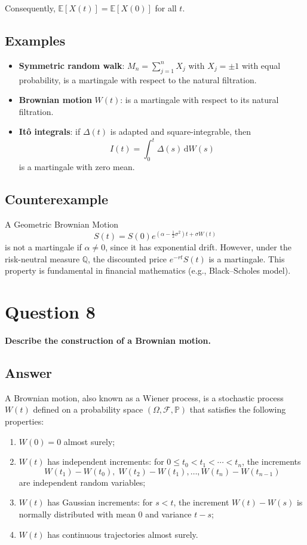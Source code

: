\documentclass[12pt,a4paper]{book}
\theoremstyle{remark}
\newcommand{\PP}{\mathbb{P}}          %
\newcommand{\EE}{\mathbb{E}}          %
\newcommand{\QQ}{\mathbb{Q}}          %
\newcommand{\F}{\mathcal{F}}          %
\newcommand{\dd}{\mathrm{d}}
\begin{document}
Consequently, $\EE[X(t)] = \EE[X(0)]$ for all $t$.

\subsection*{Examples}
\begin{itemize}
    \item \textbf{Symmetric random walk}: $M_n = \sum_{j=1}^n X_j$ with $X_j = \pm 1$ with equal probability, is a martingale with respect to the natural filtration.
    \item \textbf{Brownian motion} $W(t)$: is a martingale with respect to its natural filtration.
    \item \textbf{It\^o integrals}: if $\Delta(t)$ is adapted and square-integrable, then 
    \[
    I(t) = \int_0^t \Delta(s)\,\dd W(s)
    \]
    is a martingale with zero mean.
\end{itemize}

\subsection*{Counterexample}
A Geometric Brownian Motion 
\[
S(t) = S(0) e^{(\alpha - \tfrac{1}{2}\sigma^2)t + \sigma W(t)}
\]
is not a martingale if $\alpha \neq 0$, since it has exponential drift. However, under the risk-neutral measure $\QQ$, the discounted price $e^{-rt}S(t)$ is a martingale. This property is fundamental in financial mathematics (e.g., Black--Scholes model).


\newpage
\section{Question 8}
\textbf{Describe the construction of a Brownian motion.}

\subsection*{Answer}
A Brownian motion, also known as a Wiener process, is a stochastic process $W(t)$ defined on a probability space $(\Omega, \F, \PP)$ that satisfies the following properties:

\begin{enumerate}[label=\roman*)]
    \item $W(0) = 0$ almost surely;
    \item $W(t)$ has independent increments: for $0 \leq t_0 < t_1 < \cdots < t_n$, the increments 
    \[
        W(t_1) - W(t_0), \; W(t_2) - W(t_1), \ldots, W(t_n) - W(t_{n-1})
    \]
    are independent random variables;
    \item $W(t)$ has Gaussian increments: for $s < t$, the increment $W(t) - W(s)$ is normally distributed with mean $0$ and variance $t-s$;
    \item $W(t)$ has continuous trajectories almost surely.
\end{enumerate}
\end{document}
